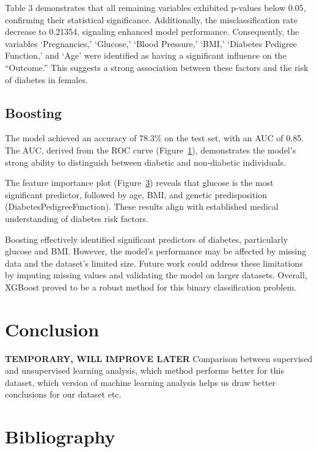 \documentclass[12pt]{article}
\begin{document}
Table 3 demonstrates that all remaining variables exhibited p-values below 0.05, confirming their statistical significance. Additionally, the misclassification rate decrease to 0.21354, signaling enhanced model performance. Consequently, the variables ‘Pregnancies,’ ‘Glucose,’ ‘Blood Pressure,’ ‘BMI,’ ‘Diabetes Pedigree Function,’ and ‘Age’ were identified as having a significant influence on the “Outcome.” This suggests a strong association between these factors and the risk of diabetes in females.

\subsection{Boosting}

The model achieved an accuracy of 78.3\% on the test set, with an AUC of 0.85. The AUC, derived from the ROC curve (Figure~\ref{fig:roc}), demonstrates the model's strong ability to distinguish between diabetic and non-diabetic individuals.

The feature importance plot (Figure~\ref{fig:importance}) reveals that glucose is the most significant predictor, followed by age, BMI, and genetic predisposition (DiabetesPedigreeFunction). These results align with established medical understanding of diabetes risk factors.

\begin{figure}[h!]
	\centering
	\begin{subfigure}{0.45\textwidth}
		\caption{}
		\label{fig:roc}
	\end{subfigure}
	\hfill
	\begin{subfigure}{0.45\textwidth}
		\caption{}
		\label{fig:importance}
	\end{subfigure}
\end{figure}

Boosting effectively identified significant predictors of diabetes, particularly glucose and BMI. However, the model's performance may be affected by missing data and the dataset's limited size. Future work could address these limitations by imputing missing values and validating the model on larger datasets. Overall, XGBoost proved to be a robust method for this binary classification problem.

\section{Conclusion}

\textbf{TEMPORARY, WILL IMPROVE LATER} Comparison between supervised and unsupervised learning analysis, which method performs better for this dataset, which version of machine learning analysis helps us draw better conclusions for our dataset etc. 

 \section{Bibliography}
  
 
\end{document}
